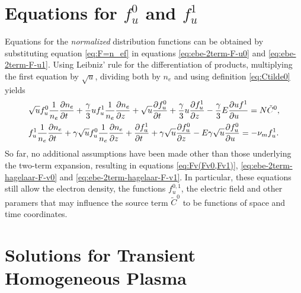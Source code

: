 \documentclass{book}
\begin{document}
\section{Equations for $f^0_u$ and $f^1_u$}

Equations for the {\em normalized} distribution functions can be obtained by
substituting equation \eqref{eq:F=n_ef} in equations \eqref{eq:ebe-2term-F-u0}
and \eqref{eq:ebe-2term-F-u1}. Using Leibniz' rule for the differentiation of
products, multiplying the first equation by $\sqrt{u}$, dividing both by $n_e$
and using definition \eqref{eq:Ctilde0} yields
\begin{align}
	&\sqrt{u}f^0_u\frac{1}{n_e}\PDEV{n_e}{t}
	+ \frac{\gamma}{3}uf^1_u\frac{1}{n_e}\PDEV{n_e}{z}
	+ \sqrt{u}\PDEV{f^0_u}{t}
	+ \frac{\gamma}{3}u\PDEV{f^1_u}{z}
	- \frac{\gamma}{3}E\PDEV{u f^1}{u}
	= N\tilde{C}^0,
	\label{eq:ebe-2term-f-u0} \\
	&f^1_u\frac{1}{n_e}\PDEV{n_e}{t}
	+ \gamma \sqrt{u}f^0_u\frac{1}{n_e}\PDEV{n_e}{z}
	+ \PDEV{f^1_u}{t}
	+ \gamma \sqrt{u}\PDEV{f^0_u}{z}
	- E\gamma \sqrt{u}\PDEV{f^0_u}{u}
	= -\nu_mf^1_u.
	\label{eq:ebe-2term-f-u1}
\end{align}
So far, no additional assumptions have been made other than those underlying the
two-term expansion, resulting in equations \eqref{eq:Fv(Fv0,Fv1)},
\eqref{eq:ebe-2term-hagelaar-F-v0} and \eqref{eq:ebe-2term-hagelaar-F-v1}.
In particular, these equations still allow the electron density, the
functions $f^{0,1}_u$, the electric field and other paramers that may influence
the source term $\tilde{C}^0$ to be functions of space and time coordinates.

\section{Solutions for Transient Homogeneous Plasma}
\end{document}

